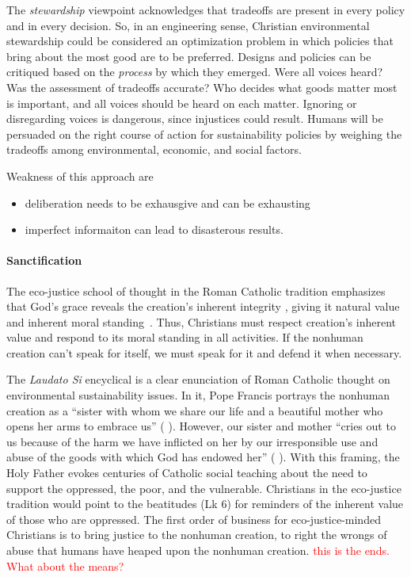 \documentclass[12pt]{article}
\newcommand{\ins}[1]{\textcolor{red}{#1}}
\begin{document}
The \emph{stewardship} viewpoint acknowledges that tradeoffs
are present in every policy and in every decision. 
So, in an engineering sense, 
Christian environmental stewardship could be considered an optimization problem
in which policies that bring about the most good 
are to be preferred.
Designs and policies can be critiqued based on the \emph{process} by which they emerged.
Were all voices heard? Was the assessment of tradeoffs accurate?
Who decides what goods matter most is important, and 
all voices should be heard on each matter.
Ignoring or disregarding voices is dangerous,
since injustices could result.
Humans will be persuaded on the right course of action
for sustainability policies by weighing the tradeoffs 
among environmental, economic, and social factors.

Weakness of this approach are
%
\begin{itemize}

  \item deliberation needs to be exhausgive and can be exhausting

  \item imperfect informaiton can lead to disasterous results.

\end{itemize}


\paragraph{Sanctification} 
\label{sec:sanctification}

The eco-justice school of thought in the Roman Catholic tradition
emphasizes that God's grace reveals the creation's 
inherent integrity \autocite[19]{Jenkins:2008}, 
giving it natural value and inherent moral standing~\autocite{Joldersma:2019}. 
Thus, Christians must respect creation's inherent value and 
respond to its moral standing in all activities.
If the nonhuman creation can't speak for itself, 
we must speak for it and defend it when necessary.

The \emph{Laudato Si} encyclical \autocite{Pope-Francis:2015aa} 
is a clear enunciation of Roman Catholic thought
on environmental sustainability issues.
In it, Pope Francis portrays the nonhuman creation as a
``sister with whom we share our life and a beautiful mother who opens her arms to embrace us''
(\textcite{Pope-Francis:2015aa} \textcite[3]{Pope-Francis:2015aa}).
However, our sister and mother
``cries out to us because of the harm we have inflicted on her 
by our irresponsible use and abuse of the goods with which God has endowed her''
(\textcite{Pope-Francis:2015aa} \textcite[3]{Pope-Francis:2015aa}).
With this framing, the Holy Father evokes centuries of Catholic social teaching
about the need to support the oppressed, the poor, and the vulnerable.
Christians in the eco-justice tradition would point to the beatitudes (Lk 6) 
for reminders of the inherent value of those who are oppressed.
The first order of business for eco-justice-minded Christians
is to bring justice to the nonhuman creation, to right the wrongs
of abuse that humans have heaped upon the nonhuman creation.
\ins{this is the ends. What about the means?}
\end{document}
